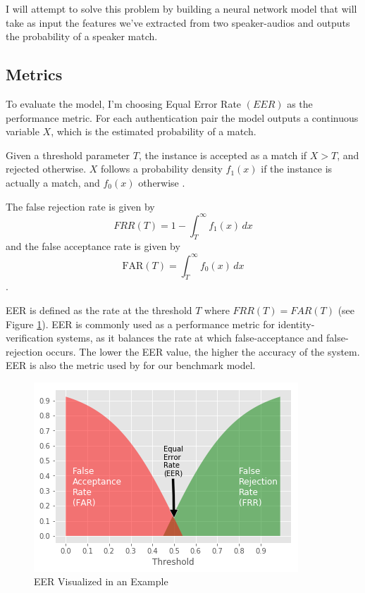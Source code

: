 \documentclass{article}
\begin{document}
I will attempt to solve this problem by building a neural network model that will take as input the features we've extracted from two speaker-audios and outputs the probability of a speaker match.
\subsection{Metrics}
To evaluate the model, I'm choosing Equal Error Rate $(EER)$ as the performance metric.
For each authentication pair the model outputs a continuous variable $X$, which is the estimated probability of a match.

Given a threshold parameter $T$, the instance is accepted as a match if $X>T$, and rejected otherwise.
$X$ follows a probability density $f_1(x)$
if the instance is actually a match, and $f_0(x)$ otherwise \cite{wiki:xxx}.

The false rejection rate is given by 
\begin{equation}
FRR(T) = 1- \int_{T}^\infty f_1(x) \, dx
\end{equation}
and the false acceptance rate is given by 
\begin{equation}
\mbox{FAR}(T)= \int_{T}^\infty f_0(x) \, dx 
\end{equation}. 

EER is defined as the rate at the threshold $T$ where $FRR(T) = FAR(T)$ (see Figure \ref{fig:EER}).
EER is commonly used as a performance metric for  identity-verification systems, as it balances the rate at which false-acceptance and false-rejection occurs. The lower the EER value, the higher the accuracy of the system. EER is also the metric used by for our benchmark model.

\begin{figure}[H]
    \centering
    \includegraphics[scale=.75]{images/eer.png}
    \caption{EER Visualized in an Example}
    \label{fig:EER}
\end{figure}
\end{document}
